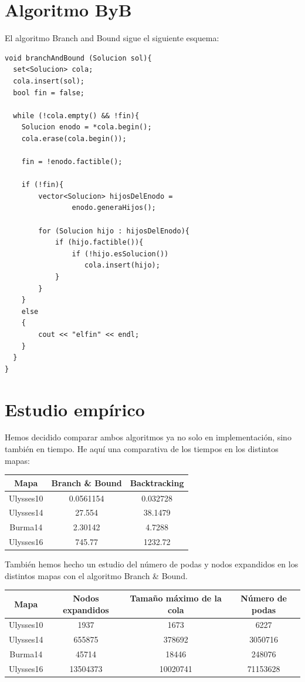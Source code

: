 \documentclass{article}
\begin{document}
	\section{Algoritmo ByB}
	El algoritmo Branch and Bound sigue el siguiente esquema:
	
	\begin{lstlisting}
void branchAndBound (Solucion sol){
  set<Solucion> cola;
  cola.insert(sol);
  bool fin = false;

  while (!cola.empty() && !fin){
	Solucion enodo = *cola.begin();
	cola.erase(cola.begin());

	fin = !enodo.factible();

	if (!fin){
		vector<Solucion> hijosDelEnodo = 
				enodo.generaHijos();

		for (Solucion hijo : hijosDelEnodo){
			if (hijo.factible()){
				if (!hijo.esSolucion())
				   cola.insert(hijo);
			}
		}
	}
	else
	{
		cout << "elfin" << endl;
	}
  }
}
	\end{lstlisting}
	
	\section{Estudio empírico}
	Hemos decidido comparar ambos algoritmos ya no solo en implementación, sino también en tiempo. He aquí una comparativa de los tiempos en los distintos mapas:
	
	\begin{longtable}{|c|c|c|}
		\hline
		Mapa & Branch \& Bound & Backtracking \\ \hline
		Ulysses10 & 0.0561154 & 0.032728  \\ \hline
		Ulysses14 & 27.554 & 38.1479 \\ \hline
		Burma14 & 2.30142 & 4.7288\\ \hline
		Ulysses16 & 745.77 & 1232.72\\ \hline
	\end{longtable}

	También hemos hecho un estudio del número de podas y nodos expandidos en los distintos mapas con el algoritmo Branch \& Bound.
	
	\begin{longtable}{|c|c|c|c|}
		\hline
		Mapa & Nodos expandidos & Tamaño máximo de la cola & Número de podas \\ \hline
		Ulysses10 & 1937 & 1673 & 6227  \\ \hline
		Ulysses14 & 655875 & 378692 & 3050716 \\ \hline
		Burma14 & 45714 & 18446 & 248076 \\ \hline
		Ulysses16 & 13504373 & 10020741 & 71153628 \\ \hline
	\end{longtable}
\end{document}
